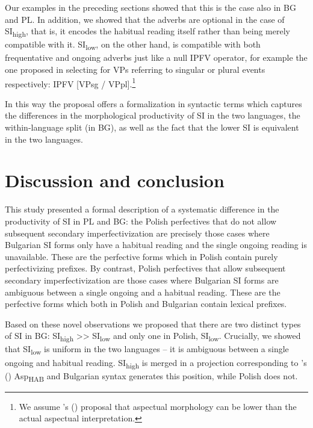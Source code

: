 \documentclass[output=paper,colorlinks,citecolor=brown]{langscibook}
\begin{document}
\noindent Our examples in the preceding sections showed that this is the case also in BG and PL. In addition, we showed that the adverbs are optional in the case of SI\textsubscript{high}, that is, it encodes the habitual reading itself rather than being merely compatible with it. SI\textsubscript{low}, on the other hand, is compatible with both frequentative and ongoing adverbs just like a null IPFV operator, for example the one proposed in \citet{kli+:ferreira2016} selecting for VPs referring to singular or plural events respectively: IPFV [VPsg / VPpl].\footnote{We assume \citeauthor{tatevosov2011}'s (\citeyear{tatevosov2011,kli+:tatevosov2015}) proposal that aspectual morphology can be lower than the actual aspectual interpretation.}

In this way the proposal offers a formalization in syntactic terms which captures the differences in the morphological productivity of SI in the two languages, the within-language split (in BG), as well as the fact that the lower SI is equivalent in the two languages. %

\section{Discussion and conclusion}
\label{section:conclusion}

This study presented a formal description of a systematic difference in the productivity of SI in PL and BG: the Polish perfectives that do not allow subsequent secondary imperfectivization are precisely those cases where Bulgarian SI forms only have a habitual reading and the single ongoing reading is unavailable. These are the perfective forms which in Polish contain purely perfectivizing prefixes. By contrast, Polish perfectives that allow subsequent secondary imperfectivization are those cases where Bulgarian SI forms are ambiguous between a single ongoing and a habitual reading. These are the perfective forms which both in Polish and Bulgarian contain lexical prefixes. 

Based on these novel observations we proposed that there are two distinct types of SI in BG: SI\textsubscript{high} >> SI\textsubscript{low} and only one in Polish, SI\textsubscript{low}. Crucially, we showed that SI\textsubscript{low} is uniform in the two languages -- it is ambiguous between a single ongoing and habitual reading. SI\textsubscript{high} is merged in a projection corresponding to \citeauthor{cinque1999}'s (\citeyear{cinque1999}) Asp\textsubscript{HAB} and Bulgarian syntax generates this position, while Polish does not.
\end{document}
